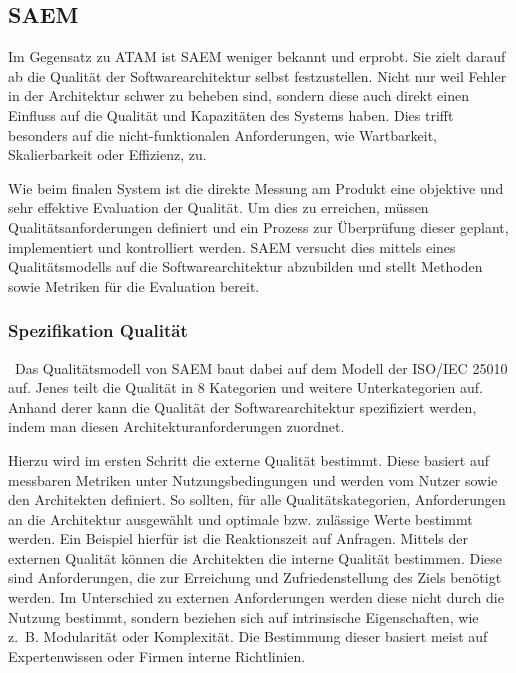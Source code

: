 \subsection{\acf*{SAEM}}

Im Gegensatz zu \ac{ATAM} ist \ac{SAEM} weniger bekannt und erprobt\cite{IEEE_TSE2002}. Sie zielt darauf ab die Qualität der Softwarearchitektur selbst festzustellen. Nicht nur weil Fehler in der Architektur schwer zu beheben sind, sondern diese auch direkt einen Einfluss auf die Qualität und Kapazitäten des Systems haben\cite{Duenas1998}. Dies trifft besonders auf die nicht-funktionalen Anforderungen, wie Wartbarkeit, Skalierbarkeit oder Effizienz, zu.

Wie beim finalen System ist die direkte Messung am Produkt eine objektive und sehr effektive Evaluation der Qualität. Um dies zu erreichen, müssen Qualitätsanforderungen definiert und ein Prozess zur Überprüfung dieser  geplant, implementiert und kontrolliert werden\cite{Duenas1998}. \ac{SAEM} versucht dies mittels eines Qualitätsmodells auf die Softwarearchitektur abzubilden und stellt Methoden sowie Metriken für die Evaluation bereit. 

\subsubsection{Spezifikation Qualität}
\
Das Qualitätsmodell von \ac{SAEM} baut dabei auf dem Modell der ISO/IEC 25010 auf. Jenes teilt die Qualität in 8 Kategorien und weitere Unterkategorien auf\cite{ISOIEC25010}. Anhand derer kann die Qualität der Softwarearchitektur spezifiziert werden, indem man diesen Architekturanforderungen zuordnet.


Hierzu wird im ersten Schritt die externe Qualität bestimmt. Diese basiert auf messbaren Metriken unter Nutzungsbedingungen und werden vom Nutzer sowie den Architekten definiert\cite{Duenas1998}. So sollten, für alle Qualitätskategorien, Anforderungen an die Architektur ausgewählt und optimale bzw. zulässige Werte bestimmt werden. Ein Beispiel hierfür ist die Reaktionszeit auf Anfragen. 
Mittels der externen Qualität können die Architekten die interne Qualität bestimmen. Diese sind Anforderungen, die zur Erreichung und Zufriedenstellung des Ziels benötigt werden. Im Unterschied zu externen Anforderungen werden diese nicht durch die Nutzung bestimmt, sondern beziehen sich auf intrinsische Eigenschaften, wie z.~B. Modularität oder Komplexität\cite{Duenas1998}. Die Bestimmung dieser basiert meist auf Expertenwissen oder Firmen interne Richtlinien.

